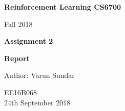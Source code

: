 \begin{titlepage}
    \begin{center}
        \vspace*{1cm}
        
        \Huge
          \textbf{Reinforcement Learning CS6700}
        
        \vspace{0.5cm}
        \LARGE
        Fall 2018
        
        \vspace{1.5cm}
        
        \textbf{Assignment 2}
   		  \vspace{1.5cm}
        
        \textbf{Report}
       
        \vfill
        
        Author: Varun Sundar
        
        \vspace{0.8cm}
          \Large
        EE16B068 \\
        \vspace{0.5cm}
       24th September 2018
        
    \end{center}
\end{titlepage}